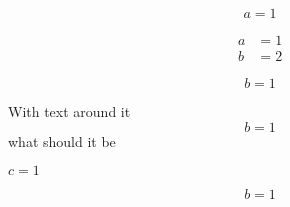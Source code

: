 \begin{equation}
    a=1
\label{eq:1}
\end{equation}

\begin{equation}
\begin{split}
    a&=1\\
    b&=2
\end{split}
\label{eq:2}
\end{equation}


$$b=1$$

With text around it $$b=1$$ what should it be

$c=1$

\[
    b = 1
\]